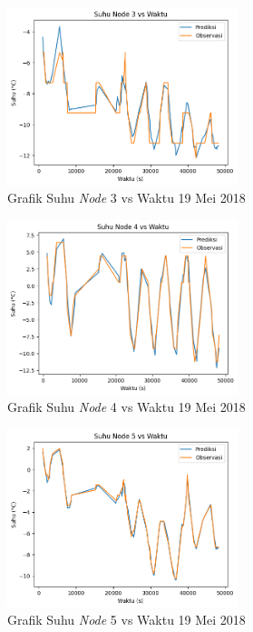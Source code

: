\begin{figure}[H]
\setlength{}
\begin{center}
\includegraphics[width=0.6\textwidth]{fig/node3_temp_2018-05-19.png}
	\caption{Grafik Suhu \textit{Node} 3 vs Waktu 19 Mei 2018}
\label{fig:node319}
\end{center}
\end{figure}

\begin{figure}[H]
\setlength{}
\begin{center}
\includegraphics[width=0.6\textwidth]{fig/node4_temp_2018-05-19.png}
	\caption{Grafik Suhu \textit{Node} 4 vs Waktu 19 Mei 2018}
\label{fig:node419}
\end{center}
\end{figure}

\begin{figure}[H]
\setlength{}
\begin{center}
\includegraphics[width=0.6\textwidth]{fig/node5_temp_2018-05-19.png}
	\caption{Grafik Suhu \textit{Node} 5 vs Waktu 19 Mei 2018}
\label{fig:node519}
\end{center}
\end{figure}

